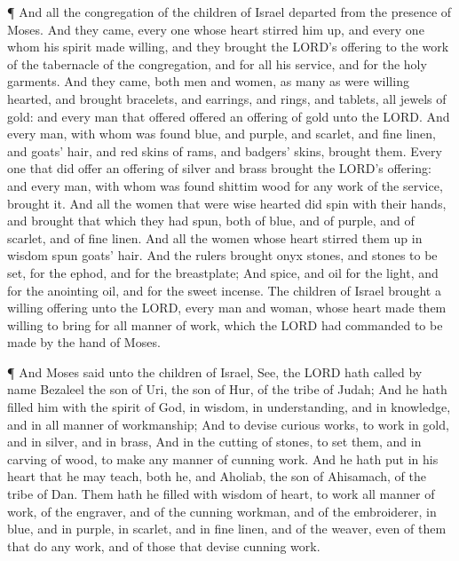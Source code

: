  ¶ And all the congregation of the children of Israel
departed from the presence of Moses.  And they came, every
one whose heart stirred him up, and every one whom his spirit made
willing, and they brought the LORD's offering to the work of the
tabernacle of the congregation, and for all his service, and for the
holy garments.  And they came, both men and women, as many
as were willing hearted, and brought bracelets, and earrings, and rings,
and tablets, all jewels of gold: and every man that offered offered an
offering of gold unto the LORD.  And every man, with whom
was found blue, and purple, and scarlet, and fine linen, and goats'
hair, and red skins of rams, and badgers' skins, brought them.
 Every one that did offer an offering of silver and brass
brought the LORD's offering: and every man, with whom was found shittim
wood for any work of the service, brought it.  And all the
women that were wise hearted did spin with their hands, and brought that
which they had spun, both of blue, and of purple, and of scarlet, and of
fine linen.  And all the women whose heart stirred them up
in wisdom spun goats' hair.  And the rulers brought onyx
stones, and stones to be set, for the ephod, and for the breastplate;
 And spice, and oil for the light, and for the anointing
oil, and for the sweet incense.  The children of Israel
brought a willing offering unto the LORD, every man and woman, whose
heart made them willing to bring for all manner of work, which the LORD
had commanded to be made by the hand of Moses.

 ¶ And Moses said unto the children of Israel, See, the
LORD hath called by name Bezaleel the son of Uri, the son of Hur, of the
tribe of Judah;  And he hath filled him with the spirit of
God, in wisdom, in understanding, and in knowledge, and in all manner of
workmanship;  And to devise curious works, to work in gold,
and in silver, and in brass,  And in the cutting of stones,
to set them, and in carving of wood, to make any manner of cunning work.
 And he hath put in his heart that he may teach, both he,
and Aholiab, the son of Ahisamach, of the tribe of Dan. 
Them hath he filled with wisdom of heart, to work all manner of work, of
the engraver, and of the cunning workman, and of the embroiderer, in
blue, and in purple, in scarlet, and in fine linen, and of the weaver,
even of them that do any work, and of those that devise cunning work.

